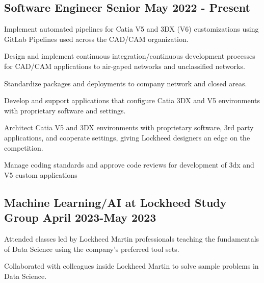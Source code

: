 \subsection{{Software Engineer Senior \hfill May 2022 - Present}}
\begin{zitemize}
\item Implement automated pipelines for Catia V5 and 3DX (V6) customizations using GitLab Pipelines used across the CAD/CAM organization.
\item Design and implement continuous integration/continuous development  processes for CAD/CAM applications to air-gaped networks and unclassified networks.\\
\item Standardize packages and deployments to company network and closed areas.
\item Develop and support applications that configure Catia 3DX and V5 environments with proprietary software and settings.
\item Architect Catia V5 and 3DX environments with proprietary software, 3rd party applications, and cooperate settings, giving Lockheed designers an edge on the competition. 
\item Manage coding standards and approve code reviews for development of 3dx and V5 custom applications\\
\end{zitemize}

\subsection{{Machine Learning/AI at Lockheed Study Group \hfill April 2023-May 2023}}
\begin{zitemize}
\item Attended classes led by Lockheed Martin professionals teaching the fundamentals of Data Science using the company's preferred tool sets.
\item Collaborated with colleagues inside Lockheed Martin to solve sample problems in Data Science.
\end{zitemize}

